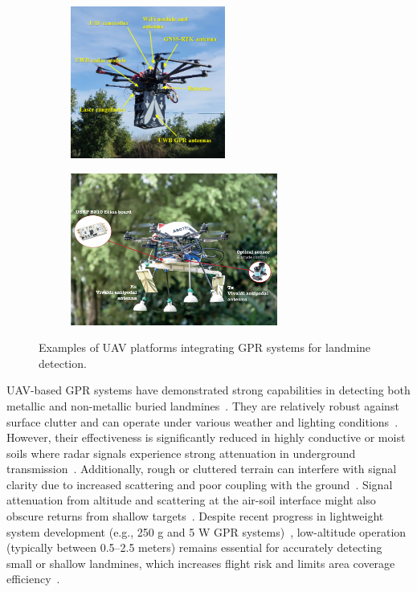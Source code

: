 \begin{figure}[h!]
    \centering
    \begin{subfigure}[b]{0.48\linewidth}
        \centering
        \includegraphics[height=5cm]{figs/Huirui/gpr_drone1.png}
        \label{fig:gpr_drone1}
    \end{subfigure}
    \hfill
    \begin{subfigure}[b]{0.48\linewidth}
        \centering
        \includegraphics[height=5cm]{figs/Huirui/gpr_drone2.png}
        \label{fig:gpr_drone2}
    \end{subfigure}
    \caption[UAV platforms with GPR for landmine detection]{Examples of UAV platforms integrating GPR systems for landmine detection.~\cite{garcia2022safedrone,cerquera2017uav}}
    \label{fig:gpr_uav_examples}
\end{figure}

\gls{UAV}-based \gls{GPR} systems have demonstrated strong capabilities in detecting both metallic and non-metallic buried landmines~\cite{vsipovs2020lightweight,colorado2017integrated}. They are relatively robust against surface clutter and can operate under various weather and lighting conditions~\cite{noviello2022overview}. However, their effectiveness is significantly reduced in highly conductive or moist soils where radar signals experience strong attenuation in underground transmission~\cite{lee2023modeling}. Additionally, rough or cluttered terrain can interfere with signal clarity due to increased scattering and poor coupling with the ground~\cite{yoo2021application}. Signal attenuation from altitude and scattering at the air-soil interface might also obscure returns from shallow targets~\cite{garcia2019autonomous}. Despite recent progress in lightweight system development (e.g., 250 g and 5 W \gls{GPR} systems)~\cite{colorado2017integrated}, low-altitude operation (typically between 0.5--2.5 meters) remains essential for accurately detecting small or shallow landmines, which increases flight risk and limits area coverage efficiency~\cite{vsipovs2020lightweight,colorado2017integrated,fernandez2021development}.



